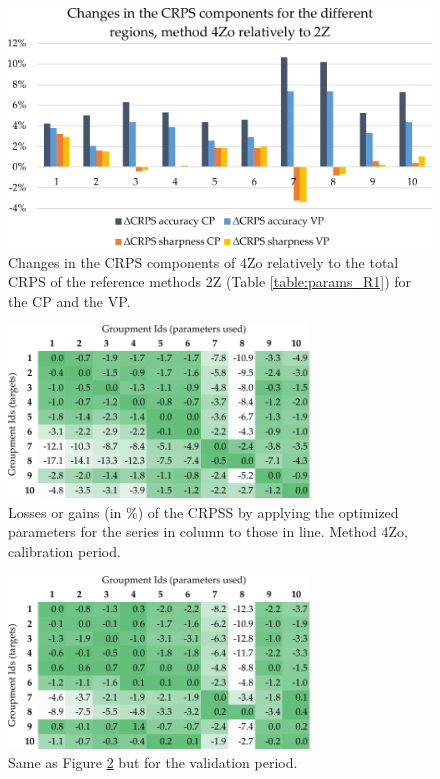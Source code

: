 \documentclass[5p]{elsarticle}
\begin{document}
\begin{figure}[htb]
	\centerline{\includegraphics[width=\linewidth]{figures/figure_dcrps_comp_4Zo.pdf}}
	\caption{Changes in the CRPS components of 4Zo relatively to the total CRPS of the reference methods 2Z (Table \ref{table:params_R1}) for the CP and the VP.}
	\label{fig:figure_dcrps_comp_4Zo}
\end{figure}

\begin{figure}[htb]
	\centerline{\includegraphics[width=8cm]{figures/table_crossing_z4_calib.pdf}}
	\caption{Losses or gains (in \%) of the CRPSS by applying the optimized parameters for the series in column to those in line. Method 4Zo, calibration period.}
	\label{fig:crossing_4Zo_calib}
\end{figure}

\begin{figure}[htb]
	\centerline{\includegraphics[width=8cm]{figures/table_crossing_z4_valid.pdf}}
	\caption{Same as Figure \ref{fig:crossing_4Zo_calib} but for the validation period.}
	\label{fig:crossing_4Zo_valid}
\end{figure}
\end{document}
